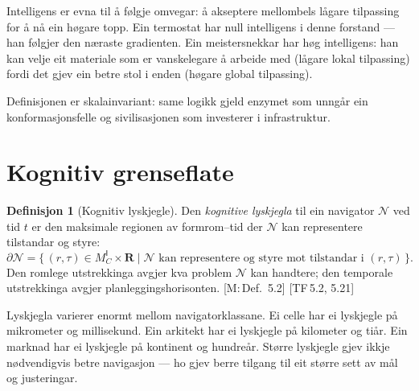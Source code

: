 \documentclass[10pt]{book}
\theoremstyle{definition}
\newtheorem{definisjon}{Definisjon}[chapter]
\theoremstyle{plain}
\theoremstyle{remark}
\newcommand{\MC}{M^{\mathsf{I}}_C}
\providecommand{\R}{}
\renewcommand{\R}{\mathbf{R}}
\newcommand{\Nav}{\mathcal{N}}
\newcommand{\CogBound}{\partial\!\Nav}
\newcommand{\TF}[1]{\textnormal{[TF\,#1]}}
\newcommand{\Mref}[1]{\textnormal{[M:\,#1]}}
\begin{document}
Intelligens er evna til \aa{} f\o lgje omvegar: \aa{} akseptere mellombels l\aa gare tilpassing for \aa{} n\aa{} ein h\o gare topp. Ein termostat har null intelligens i denne forstand --- han f\o lgjer den n\ae raste gradienten. Ein meistersnekkar har h\o g intelligens: han kan velje eit materiale som er vanskelegare \aa{} arbeide med (l\aa gare lokal tilpassing) fordi det gjev ein betre stol i enden (h\o gare global tilpassing).

Definisjonen er skalainvariant: same logikk gjeld enzymet som unng\aa r ein konformasjonsfelle og sivilisasjonen som investerer i infrastruktur.

\section{Kognitiv grenseflate}\label{sec:nav:lyskjegle}

\begin{definisjon}[Kognitiv lyskjegle]\label{def:lyskjegle}
Den \emph{kognitive lyskjegla} til ein navigator $\Nav$ ved tid $t$ er den maksimale regionen av formrom--tid der $\Nav$ kan representere tilstandar og styre:
\[
  \CogBound = \bigl\{\, (r, \tau) \in \MC \times \R \;\big|\; \Nav \text{ kan representere og styre mot tilstandar i } (r, \tau) \,\bigr\}.
\]
Den romlege utstrekkinga avgjer kva problem $\Nav$ kan handtere; den temporale utstrekkinga avgjer planleggingshorisonten. \Mref{Def.~5.2} \TF{5.2, 5.21}
\end{definisjon}

Lyskjegla varierer enormt mellom navigatorklassane. Ei celle har ei lyskjegle p\aa{} mikrometer og millisekund. Ein arkitekt har ei lyskjegle p\aa{} kilometer og ti\aa r. Ein marknad har ei lyskjegle p\aa{} kontinent og hundre\aa r. St\o rre lyskjegle gjev ikkje n\o dvendigvis betre navigasjon --- ho gjev berre tilgang til eit st\o rre sett av m\aa l og justeringar.
\end{document}
